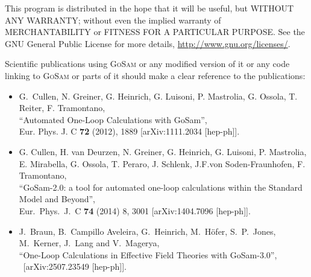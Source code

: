 \documentclass[11pt,a4paper, oneside]{scrbook}
\newcommand{\gosam}{\textsc{GoSam}\xspace}
\begin{document}
    This program is distributed in the hope that it will be useful,
    but WITHOUT ANY WARRANTY; without even the implied warranty of
    MERCHANTABILITY or FITNESS FOR A PARTICULAR PURPOSE.  See the
    GNU General Public License for more details, 
    \url{http://www.gnu.org/licenses/}.

   
    Scientific publications using \gosam or any modified version of
    it or any code linking to \gosam or parts of it should make a clear
    reference to the publications:

    \begin{itemize}
      \item G.~Cullen, N. Greiner, G. Heinrich, G. Luisoni, 
            P. Mastrolia, G. Ossola, T. Reiter, F. Tramontano,\\
            ``Automated One-Loop Calculations with GoSam'',\\
            Eur. Phys. J. C \textbf{72} (2012), 1889 [arXiv:1111.2034 [hep-ph]].
      \item G. Cullen,  H. van Deurzen, N. Greiner, G. Heinrich, G. Luisoni,
            P. Mastrolia, E. Mirabella, G. Ossola, T. Peraro, J. Schlenk,
            J.F.von Soden-Fraunhofen, F. Tramontano,\\
            ``GoSam-2.0: a tool for automated one-loop calculations within the Standard Model and Beyond'',\\
            Eur.\ Phys.\ J.\ C \textbf{74} (2014) 8,  3001 [arXiv:1404.7096 [hep-ph]].
      \item J.~Braun, B.~Campillo Aveleira, G.~Heinrich, M.~H{\"o}fer, S.~P.~Jones, M.~Kerner, J.~Lang and V.~Magerya,\\
            ``One-Loop Calculations in Effective Field Theories with GoSam-3.0'',\\
            ~[arXiv:2507.23549 [hep-ph]].
   \end{itemize}






\end{document}

